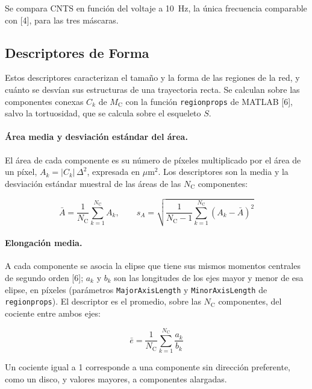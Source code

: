 Se compara CNTS en función del voltaje a 10~Hz, la única frecuencia comparable con [4], para las tres máscaras.
\endgroup


\subsection{Descriptores de Forma}

Estos descriptores caracterizan el tamaño y la forma de las regiones de la red, y cuánto se desvían sus estructuras de una trayectoria recta. Se calculan sobre las componentes conexas $C_k$ de $M_{\mathrm{C}}$ con la función \texttt{regionprops} de MATLAB [6], salvo la tortuosidad, que se calcula sobre el esqueleto $S$.

\paragraph{Área media y desviación estándar del área.}
El área de cada componente es su número de píxeles multiplicado por el área de un píxel, $A_k = |C_k|\,\Delta^2$, expresada en $\mu$m$^2$. Los descriptores son la media y la desviación estándar muestral de las áreas de las $N_{\mathrm{C}}$ componentes:

\begin{equation}
\bar A = \frac{1}{N_{\mathrm{C}}}\sum_{k=1}^{N_{\mathrm{C}}} A_k, \qquad
s_A = \sqrt{\frac{1}{N_{\mathrm{C}}-1}\sum_{k=1}^{N_{\mathrm{C}}} \left(A_k - \bar A\right)^2}
\label{eq:area}
\end{equation}

\paragraph{Elongación media.}
A cada componente se asocia la elipse que tiene sus mismos momentos centrales de segundo orden [6]; $a_k$ y $b_k$ son las longitudes de los ejes mayor y menor de esa elipse, en píxeles (parámetros \texttt{MajorAxisLength} y \texttt{MinorAxisLength} de \texttt{regionprops}). El descriptor es el promedio, sobre las $N_{\mathrm{C}}$ componentes, del cociente entre ambos ejes:

\begin{equation}
\bar e = \frac{1}{N_{\mathrm{C}}}\sum_{k=1}^{N_{\mathrm{C}}} \frac{a_k}{b_k}
\label{eq:elong}
\end{equation}

Un cociente igual a 1 corresponde a una componente sin dirección preferente, como un disco, y valores mayores, a componentes alargadas.

